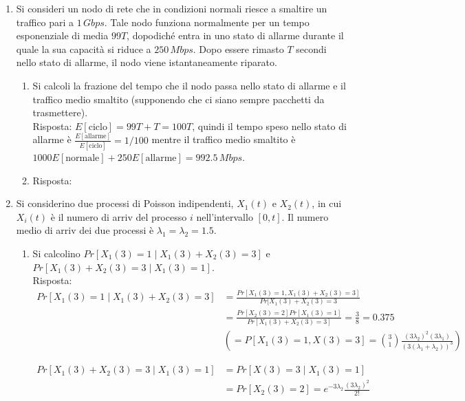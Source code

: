 \documentclass{article}
\begin{document}
\begin{enumerate}
    \item Si consideri un nodo di rete che in condizioni normali riesce a smaltire un traffico pari a $1\,Gbps$.
    Tale nodo funziona normalmente per un tempo esponenziale di media $99T$, dopodiché entra in uno stato di allarme durante il quale la sua capacità si riduce a $250\,Mbps$.
    Dopo essere rimasto $T$ secondi nello stato di allarme, il nodo viene istantaneamente riparato.
    \begin{enumerate}[label=\alph*)]
        \item Si calcoli la frazione del tempo che il nodo passa nello stato di allarme e il traffico medio smaltito (supponendo che ci siano sempre pacchetti da trasmettere).\\
        
        Risposta: $E[\text{ciclo}] = 99T + T = 100T$, quindi il tempo speso nello stato di allarme è $\frac{E[\text{allarme}]}{E[\text{ciclo}]} = 1/100$ mentre il traffico medio smaltito è $1000E[\text{normale}]+250E[\text{allarme}] = 992.5\,Mbps$.
        \item Risposta:
    \end{enumerate}
    
    \item Si considerino due processi di Poisson indipendenti, $X_1(t)$ e $X_2(t)$, in cui $X_i(t)$ è il numero di arriv del processo $i$ nell'intervallo $[0,t]$.
    Il numero medio di arriv dei due processi è $\lambda_1 = \lambda_2 = 1.5$.
    \begin{enumerate}[label=\alph*)]
        \item Si calcolino $Pr[X_1(3) = 1\mid X_1(3)+X_2(3)=3]$ e $Pr[X_1(3)+X_2(3)= 3\mid X_1(3)=1]$.\\
        
        Risposta: 
		\begin{align*}
		Pr[X_1(3) = 1\mid X_1(3)+X_2(3)=3] &= \frac{Pr[X_1(3) = 1, X_1(3) + X_2(3) = 3]}{Pr[X_1(3) + X_2(3) = 3}\\
		&= \frac{Pr[X_2(3) = 2]Pr[X_1(3) = 1]}{Pr[X_1(3) + X_2(3) = 3]} = \frac{3}{8} = 0.375\\
		&\left(= P[X_1(3) = 1, X(3) = 3] = \binom{3}{1} \frac{(3\lambda_2)^2(3\lambda_1)}{(3(\lambda_1+\lambda_2))^3}\right)
		\end{align*}
		
		\begin{align*}
		Pr[X_1(3)+X_2(3)= 3\mid X_1(3)=1] &= Pr[X(3) = 3\mid X_1(3) = 1]\\
		&= Pr[X_2(3) = 2] = e^{-3\lambda_2}\frac{(3\lambda_2)^2}{2!}
		\end{align*}		     
        

\end{enumerate}
\end{enumerate}
\end{document}
